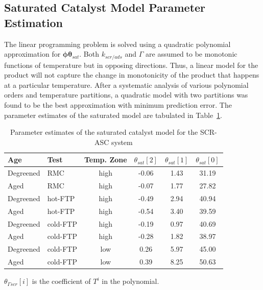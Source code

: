\subsection{Saturated Catalyst Model Parameter Estimation}

The linear programming problem is solved using a quadratic polynomial
approximation for $\pmb \phi \pmb \theta_{sat}$. Both $k_{scr/ads}$ and
$\Gamma$ are assumed to be monotonic functions of temperature but in opposing
directions. Thus, a linear model for the product will not capture the change in
monotonicity of the product that happens at a particular temperature. After a
systematic analysis of various polynomial orders and temperature partitions, a
quadratic model with two partitions was found to be the best approximation with
minimum prediction error. The parameter estimates of the saturated model are
tabulated in Table~\ref{tab::sat_parm_est}.

\begin{table}[!ht]
        \centering
        \caption{Parameter estimates of the saturated catalyst model for the SCR-ASC system}
        \label{tab::sat_parm_est}
        \begin{tabular}{l l c c c c}
                \hline \hline
                Age & Test & Temp. Zone &
                $ \theta_{sat}[2]$ &
                $ \theta_{sat}[1]$ &
                $ \theta_{sat}[0]$ \\ \hline \hline
                Degreened & RMC & high & -0.06 & 1.43 & 31.19 \\
                Aged & RMC & high & -0.07 & 1.77 & 27.82\\      \hline
                Degreened & hot-FTP & high & -0.49 & 2.94 & 40.94 \\
                Aged & hot-FTP & high & -0.54 & 3.40 & 39.59 \\         \hline
                Degreened & cold-FTP & high & -0.19 & 0.97 & 40.69 \\
                Aged & cold-FTP & high & -0.28 & 1.82 & 38.97\\         \hline
                Degreened & cold-FTP & low & 0.26 &  5.97 & 45.00 \\
                Aged & cold-FTP & low & 0.39 & 8.25 & 50.63 \\
                \hline \hline
        \end{tabular}

        $ \theta_{\Gamma scr} [i]$ is the coefficient of $T^i$ in the polynomial.
\end{table}


